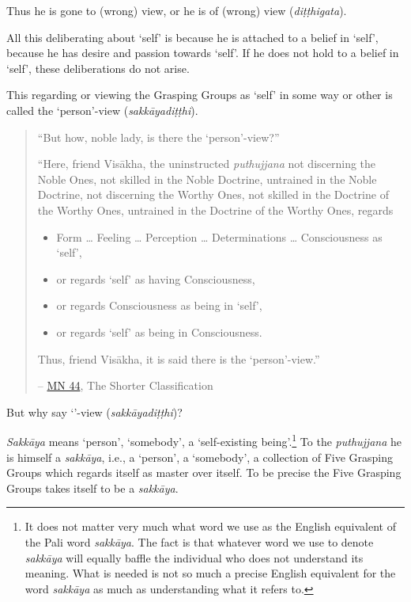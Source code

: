 Thus he is gone to (wrong) view, or he is of (wrong) view (\emph{diṭṭhigata}).

All this deliberating about `self' is because he is attached to a belief in `self', because he has desire and passion towards `self'. If he does not hold to a belief in `self', these deliberations do not arise.

This regarding or viewing the Grasping Groups as `self' in some way or other is called the `person'-view (\emph{sakkāyadiṭṭhi}).

\begin{quote}
``But how, noble lady, is there the `person'-view?''

``Here, friend Visākha, the uninstructed \emph{puthujjana} not discerning the Noble Ones, not skilled in the Noble Doctrine, untrained in the Noble Doctrine, not discerning the Worthy Ones, not skilled in the Doctrine of the Worthy Ones, untrained in the Doctrine of the Worthy Ones, regards

\begin{itemize}
\item
  Form \ldots{} Feeling \ldots{} Perception \ldots{} Determinations \ldots{} Consciousness as `self',
\item
  or regards `self' as having Consciousness,
\item
  or regards Consciousness as being in `self',
\item
  or regards `self' as being in Consciousness.
\end{itemize}

Thus, friend Visākha, it is said there is the `person'-view.''

 -- \href{https://suttacentral.net/mn44/en/sujato}{MN 44}, The Shorter Classification
\end{quote}

But why say `'-view (\emph{sakkāyadiṭṭhi})?

\emph{Sakkāya} means `person', `somebody', a `self-existing being'.\footnote{It does not matter very much what word we use as the English equivalent of the Pali word \emph{sakkāya}. The fact is that whatever word we use to denote \emph{sakkāya} will equally baffle the individual who does not understand its meaning. What is needed is not so much a precise English equivalent for the word \emph{sakkāya} as much as understanding what it refers to.} To the \emph{puthujjana} he is himself a \emph{sakkāya}, i.e., a `person', a `somebody', a collection of Five Grasping Groups which regards itself as master over itself. To be precise the Five Grasping Groups takes itself to be a \emph{sakkāya}.

